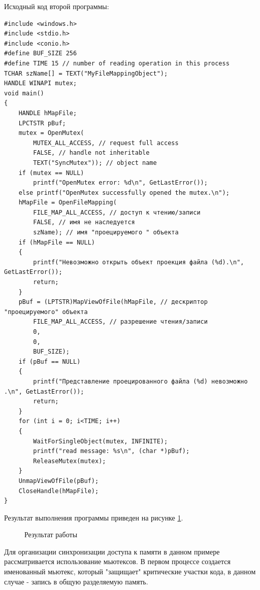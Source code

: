 \documentclass[a4paper]{article}
\begin{document}
	Исходный код второй программы:
	\begin{lstlisting}[style=crs_cpp]
#include <windows.h>
#include <stdio.h>
#include <conio.h>
#define BUF_SIZE 256
#define TIME 15 // number of reading operation in this process
TCHAR szName[] = TEXT("MyFileMappingObject");
HANDLE WINAPI mutex;
void main()
{
	HANDLE hMapFile;
	LPCTSTR pBuf;
	mutex = OpenMutex(
		MUTEX_ALL_ACCESS, // request full access
		FALSE, // handle not inheritable
		TEXT("SyncMutex")); // object name
	if (mutex == NULL)
		printf("OpenMutex error: %d\n", GetLastError());
	else printf("OpenMutex successfully opened the mutex.\n");
	hMapFile = OpenFileMapping(
		FILE_MAP_ALL_ACCESS, // доступ к чтению/записи
		FALSE, // имя не наследуется
		szName); // имя "проецируемого " объекта
	if (hMapFile == NULL)
	{
		printf("Невозможно открыть объект проекция файла (%d).\n", GetLastError());
		return;
	}
	pBuf = (LPTSTR)MapViewOfFile(hMapFile, // дескриптор "проецируемого" объекта
		FILE_MAP_ALL_ACCESS, // разрешение чтения/записи
		0,
		0,
		BUF_SIZE);
	if (pBuf == NULL)
	{
		printf("Представление проецированного файла (%d) невозможно .\n", GetLastError());
		return;
	}
	for (int i = 0; i<TIME; i++)
	{
		WaitForSingleObject(mutex, INFINITE);
		printf("read message: %s\n", (char *)pBuf);
		ReleaseMutex(mutex);
	}
	UnmapViewOfFile(pBuf);
	CloseHandle(hMapFile);
}
	\end{lstlisting}
	
	Результат выполнения программы приведен на рисунке \ref{img:task8}.
	\begin{figure}[h!]
		\caption{Результат работы}
		\label{img:task8}
	\end{figure}
	
	Для организации синхронизации доступа к памяти в данном примере рассматривается использование мьютексов. В первом процессе создается именованный мьютекс, который "защищает" критические участки кода, в данном случае - запись в общую разделяемую память.
	
\end{document}
